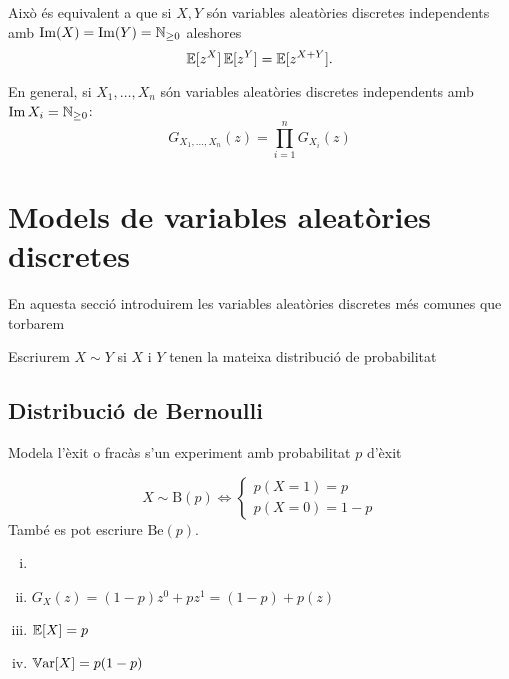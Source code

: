 \begin{obs}
    Això \'es equivalent a que si $X, Y$ són variables aleatòries discretes independents
    amb $\operatorname{Im}(X) = \operatorname{Im}(Y) = \mathbb{N}_{\geq 0}$ aleshores
    \[
        \operatorname{\mathbb{E}}[z^X]\operatorname{\mathbb{E}}[z^Y] = \operatorname{\mathbb{E}}[z^{X+Y}].
    \]
\end{obs}

\begin{obs}
    En general, si $X_1, \dots, X_n$ són variables aleatòries discretes independents amb
    $\operatorname{Im} X_i = \mathbb{N}_{\geq 0}$:
    \[
        G_{X_1,\dots,X_n}(z) = \prod_{i = 1}^n G_{X_i}(z)
    \]
\end{obs}

\section{Models de variables aleatòries discretes}

En aquesta secció introduirem les variables aleatòries discretes més comunes que torbarem

\begin{obs}
    Escriurem $X \sim Y$ si $X$ i $Y$ tenen la mateixa distribució de probabilitat
\end{obs}

\subsection*{Distribució de Bernoulli}

Modela l'èxit o fracàs s'un experiment amb probabilitat $p$ d'èxit

\begin{defi}
    \[X \sim \mathrm{B}(p) \iff \begin{cases}
                       p(X=1) = p \\
                       p(X=0) = 1-p
                       \end{cases}
    \]
    També es pot escriure $\mathrm{Be}(p)$.
\end{defi}

\begin{prop}
    \begin{enumerate}[i)]
        \item[]
        \item $G_X(z) = (1-p)z^0 + pz^1 = (1-p) + p(z)$
        \item $\operatorname{\mathbb{E}}[X] = p$
        \item $\operatorname{\mathbb{V}ar}[X] = p(1-p)$
    \end{enumerate}
\end{prop}

